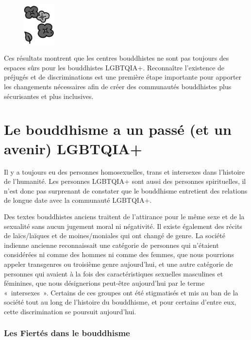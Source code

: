 \documentclass[12pt,openany]{book}
\begin{document}
\begin{figure}
    \centering
    \includegraphics[width=0.15\textwidth]{2bw4.png}
\end{figure}

Ces résultats montrent que les centres bouddhistes ne sont pas toujours des espaces sûrs pour les bouddhistes \mbox{LGBTQIA+}. Reconnaître l’existence de préjugés et de discriminations est une première étape importante pour apporter les changements nécessaires afin de créer des communautés bouddhistes plus sécurisantes et plus inclusives.

\section*{Le bouddhisme a un passé (et un avenir) \mbox{LGBTQIA+}}

\noindent Il y a toujours eu des personnes homosexuelles, trans et intersexes dans l’histoire de l’humanité. Les personnes \mbox{LGBTQIA+} sont aussi des personnes spirituelles, il n’est donc pas surprenant de constater que le bouddhisme entretient des relations de longue date avec la communauté \mbox{LGBTQIA+}.

Des textes bouddhistes anciens traitent de l’attirance pour le même sexe et de la sexualité sans aucun jugement moral ni négativité. Il existe également des récits de laïcs/laïques et de moines/moniales qui ont changé de genre. La société indienne ancienne reconnaissait une catégorie de personnes qui n’étaient considérées ni comme des hommes ni comme des femmes, que nous pourrions appeler transgenres ou troisième genre aujourd’hui, et une autre catégorie de personnes qui avaient à la fois des caractéristiques sexuelles masculines et féminines, que nous désignerions peut-être aujourd’hui par le terme \mbox{« intersexes »}. Certains de ces groupes ont été stigmatisés et mis au ban de la société tout au long de l’histoire du bouddhisme, et pour certains d’entre eux, cette discrimination se poursuit aujourd’hui.

\subsubsection*{Les Fiertés dans le bouddhisme}
\end{document}
